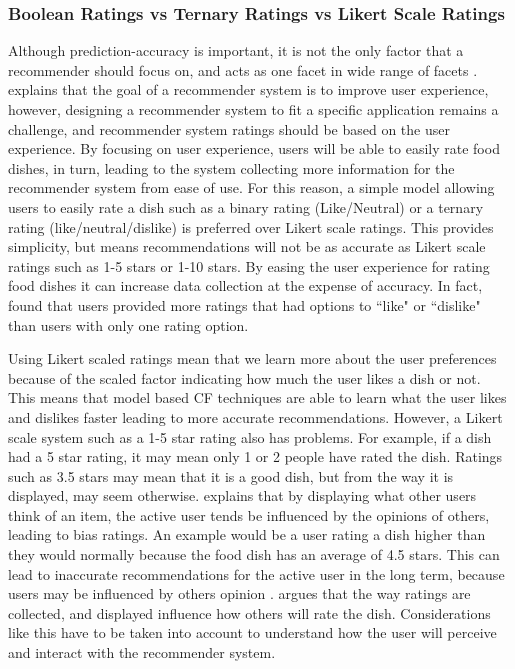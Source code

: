 \subsubsection{Boolean Ratings vs Ternary Ratings vs Likert Scale Ratings}

Although prediction-accuracy is important, it is not the only factor that a recommender should focus on, and acts as one facet in wide range of facets \cite{martin2009recsys}. \citeauthor{martin2009recsys} \cite{martin2009recsys} explains that the goal of a recommender system is to improve user experience, however, designing a recommender system to fit a specific application remains a challenge, and recommender system ratings should be based on the user experience. By focusing on user experience, users will be able to easily rate food dishes, in turn, leading to the system collecting more information for the recommender system from ease of use. For this reason, a simple model allowing users to easily rate a dish such as a binary rating (Like/Neutral) or a ternary rating (like/neutral/dislike) is preferred over Likert scale ratings. This provides simplicity, but means recommendations will not be as accurate as Likert scale ratings such as 1-5 stars or 1-10 stars. By easing the user experience for rating food dishes it can increase data collection at the expense of accuracy. In fact, \citeauthor{movieratings} \cite{schafer2007collaborative, moveratings} found that users provided more ratings that had options to ``like" or ``dislike" than users with only one rating option. 

Using Likert scaled ratings mean that we learn more about the user preferences because of the scaled factor indicating how much the user likes a dish or not. This means that model based CF techniques are able to learn what the user likes and dislikes faster leading to more accurate recommendations. However, a Likert scale system such as a 1-5 star rating also has problems. For example, if a dish had a 5 star rating, it may mean only 1 or 2 people have rated the dish. Ratings such as 3.5 stars may mean that it is a good dish, but from the way it is displayed, may seem otherwise. \citeauthor{interface} \cite{interface} explains that by displaying what other users think of an item, the active user tends be influenced by the opinions of others, leading to bias ratings. An example would be a user rating a dish higher than they would normally because the food dish has an average of 4.5 stars. This can lead to inaccurate recommendations for the active user in the long term, because users may be influenced by others opinion \cite{interface}. \citeauthor{interface} argues that the way ratings are collected, and displayed influence how others will rate the dish. Considerations like this have to be taken into account to understand how the user will perceive and interact with the recommender system.  

